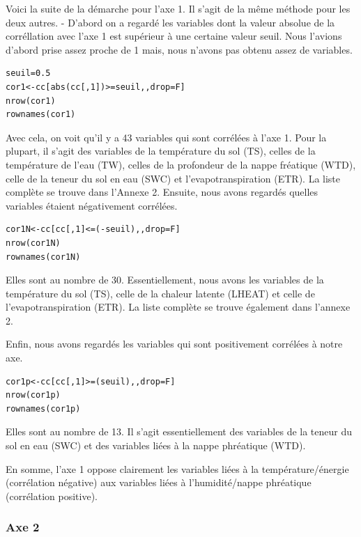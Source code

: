 \documentclass[a4paper,12pt]{report}%
\begin{document}
Voici la suite de la démarche pour l'axe 1. Il s'agit de la même méthode pour les deux autres. \newline 
-  D'abord on a regardé les variables dont la valeur absolue de la corréllation avec l'axe 1 est supérieur à une certaine valeur seuil. Nous l'avions d'abord prise assez proche de 1 mais, nous n'avons pas obtenu assez de variables.

\begin{lstlisting}
seuil=0.5
cor1<-cc[abs(cc[,1])>=seuil,,drop=F]
nrow(cor1)
rownames(cor1)
\end{lstlisting}

Avec cela, on  voit qu'il y a 43 variables qui sont corrélées à l'axe 1.  Pour la plupart, il s'agit des variables de la température du sol (TS), celles de la température de l'eau (TW),  celles de la profondeur de la nappe fréatique (WTD), celle de la teneur du sol en eau (SWC) et l'evapotranspiration (ETR). La liste complète se trouve dans l'Annexe 2. \newline
Ensuite, nous avons regardés quelles variables étaient négativement corrélées. 

\begin{lstlisting}
cor1N<-cc[cc[,1]<=(-seuil),,drop=F]
nrow(cor1N)
rownames(cor1N)
\end{lstlisting}
Elles sont au nombre de 30. Essentiellement, nous avons les variables de la température du sol (TS), celle de la chaleur latente (LHEAT) et celle de l'evapotranspiration (ETR). La liste complète se trouve également dans l'annexe 2.

Enfin, nous avons regardés les variables qui sont positivement corrélées à notre axe.  
\begin{lstlisting}
cor1p<-cc[cc[,1]>=(seuil),,drop=F]
nrow(cor1p)
rownames(cor1p)
\end{lstlisting}

Elles sont au nombre de 13. Il s'agit essentiellement des variables de la teneur du sol en eau (SWC) et des variables liées à la nappe phréatique (WTD). \newline

En somme, l’axe 1 oppose clairement les variables liées à la température/énergie (corrélation négative) aux variables liées à l’humidité/nappe phréatique (corrélation positive).

\subsubsection{Axe 2}
\end{document}
